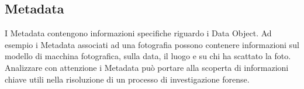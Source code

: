 \subsection{Metadata}
I Metadata contengono informazioni specifiche riguardo i Data Object. Ad esempio i Metadata associati ad una fotografia possono contenere informazioni sul modello di macchina fotografica, sulla data, il luogo e su chi ha scattato la foto.
Analizzare con attenzione i Metadata può portare alla scoperta di informazioni chiave utili nella risoluzione di un processo di investigazione forense.